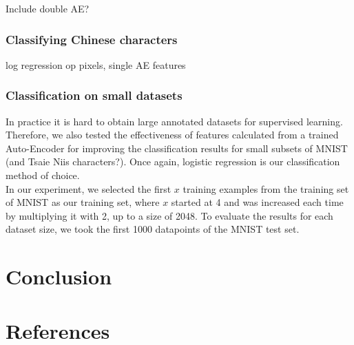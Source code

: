 \documentclass{article}
\begin{document}
Include double AE?

\subsubsection{Classifying Chinese characters}

log regression op pixels, single AE features

\subsubsection{Classification on small datasets}

In practice it is hard to obtain large annotated datasets for supervised learning. Therefore, we also tested the effectiveness of features calculated from a trained Auto-Encoder for improving the classification results for small subsets of MNIST (and Tsaie Niis characters?). Once again, logistic regression is our classification method of choice. \\ In our experiment, we selected the first $x$ training examples from the training set of MNIST as our training set, where $x$ started at 4 and was increased each time by multiplying it with 2, up to a size of 2048. To evaluate the results for each dataset size, we took the first 1000 datapoints of the MNIST test set.

\section*{Conclusion}



\section*{References}
\end{document}
